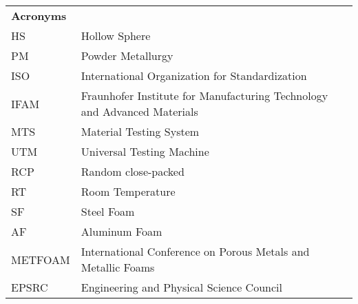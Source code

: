 \documentclass[review]{elsarticle}
\begin{document}
{\begin{table}[htbp]
	\begin{tabular}{ll}
		\textbf{Acronyms} \\
		HS    & Hollow Sphere \\
		PM    & Powder Metallurgy \\
		ISO   & International Organization for Standardization \\
		IFAM  & Fraunhofer Institute for Manufacturing Technology and Advanced Materials \\
		MTS   & Material Testing System \\
		UTM   & Universal Testing Machine \\
		RCP   & Random close-packed \\
		RT    & Room Temperature \\
		SF    & Steel Foam \\
		AF    & Aluminum Foam \\
		METFOAM & International Conference on Porous Metals and Metallic Foams \\
		EPSRC & Engineering and Physical Science Council \\
	\end{tabular}%
\end{table}%

\renewcommand{\nomname}{List of Symbols}








}
\end{document}
